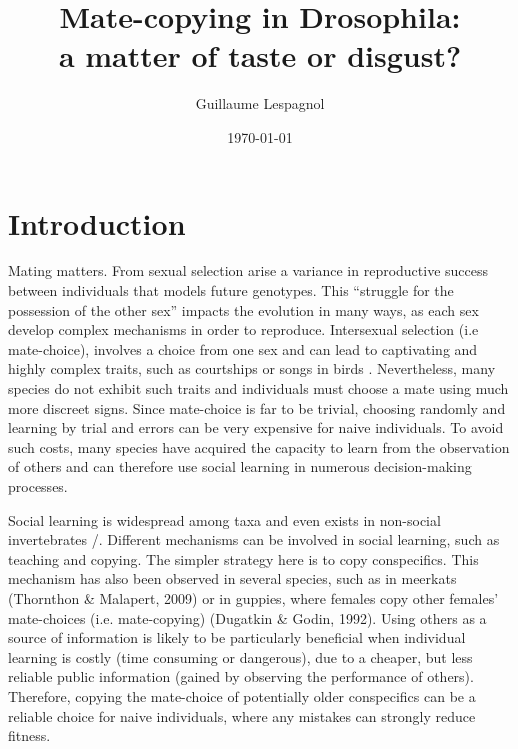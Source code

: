 \documentclass[a4paper, 12pt]{article}
\title{\Huge Mate-copying in Drosophila:\\ a matter of taste or disgust?}
\author{Guillaume Lespagnol}
\date{\today}
\begin{document}
	
	\maketitle
	
	\tableofcontents
	
	\bigskip
	
	
	\parencite{}
	
	
	
	
	\section{Introduction}

	Mating matters. From sexual selection arise a variance in reproductive success between individuals that models future genotypes.
	This “struggle for the possession of the other sex” \parencite{darwin_origin_1859} impacts the evolution in many ways, as each sex develop complex mechanisms in order to reproduce.
	Intersexual selection (i.e mate-choice), involves a choice from one sex and can lead to captivating and highly complex traits, such as courtships or songs in birds \parencite{Danchin_behavioral_2008}.
	Nevertheless, many species do not exhibit such traits and individuals must choose a mate using much more discreet signs.
	Since mate-choice is far to be trivial, choosing randomly and learning by trial and errors can be very expensive for naive individuals.
	To avoid such costs, many species have acquired the capacity to learn from the observation of others and can therefore use social learning in numerous decision-making processes.
	
	Social learning is widespread among taxa and even exists in non-social invertebrates \parencite{Coolen_social_2005, Laidre_How_ 2009}/. Different mechanisms can be involved in social learning, such as teaching and copying. The simpler strategy here is to copy conspecifics. This mechanism has also been observed in several species, such as in meerkats (Thornthon \& Malapert, 2009) or in guppies, where females copy other females’ mate-choices (i.e. mate-copying) (Dugatkin \& Godin, 1992). Using others as a source of information is likely to be particularly beneficial when individual learning is costly (time consuming or dangerous), due to a cheaper, but less reliable public information (gained by observing the performance of others). Therefore, copying the mate-choice of potentially older conspecifics can be a reliable choice for naive individuals, where any mistakes can strongly reduce fitness.
	
\end{document}
